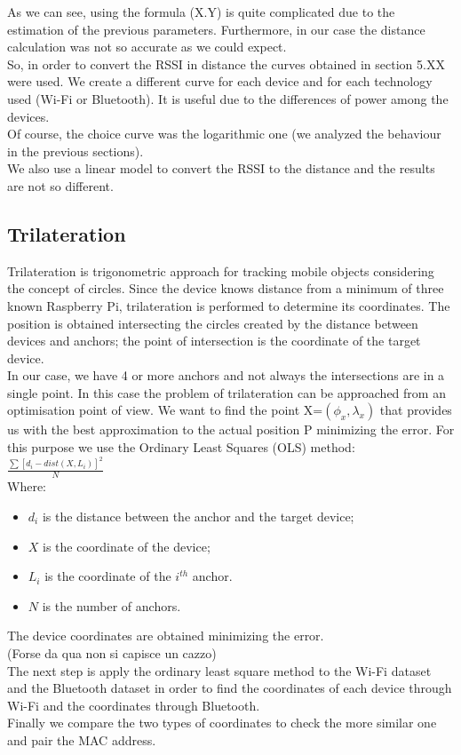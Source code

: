 \linebreak
As we can see, using the formula (X.Y) is quite complicated due to the estimation of the previous parameters. Furthermore, in our case the distance calculation was not so accurate as we could expect.\\
\linebreak
So, in order to convert the RSSI in distance the curves obtained in section 5.XX were used. We create a different curve for each device and for each technology used (Wi-Fi or Bluetooth). It is useful due to the differences of power among the devices.\\
\linebreak
Of course, the choice curve was the logarithmic one (we analyzed the behaviour in the previous sections).\\
We also use a linear model to convert the RSSI to the distance and the results are not so different.

\subsection{Trilateration}
Trilateration is trigonometric approach for tracking mobile objects considering the concept of circles. Since the device knows distance from a minimum of three known Raspberry Pi, trilateration is performed to determine its coordinates. The position is obtained intersecting the circles created by the distance between devices and anchors; the point of intersection is the coordinate of the target device.\\
\linebreak
In our case, we have 4 or more anchors and not always the intersections are in a single point. In this case the problem of trilateration can be approached from an optimisation point of view. We want to find the point X=\(\left(\phi_x, \lambda_x\right)\) that provides us with the best approximation to the actual position P minimizing the error. For this purpose we use the Ordinary Least Squares (OLS) method: \(\frac{\sum { \left[d_i  -dist\left(X,L_i\right)\right] }^2 }{N}\)\\
Where:
\begin{itemize}
\item \(d_i\) is the distance between the anchor and the target device;
\item \(X\) is the coordinate of the device;
\item \(L_i\) is the coordinate of the \(i^{th}\) anchor.
\item \(N\) is the number of anchors.
\end{itemize}
The device coordinates are obtained minimizing the error.\\
\linebreak
(Forse da qua non si capisce un cazzo)\\
The next step is apply the ordinary least square method to the Wi-Fi dataset and the Bluetooth dataset in order to find the coordinates of each device through Wi-Fi and the coordinates through Bluetooth.\\
Finally we compare the two types of coordinates to check the more similar one and pair the MAC address.

